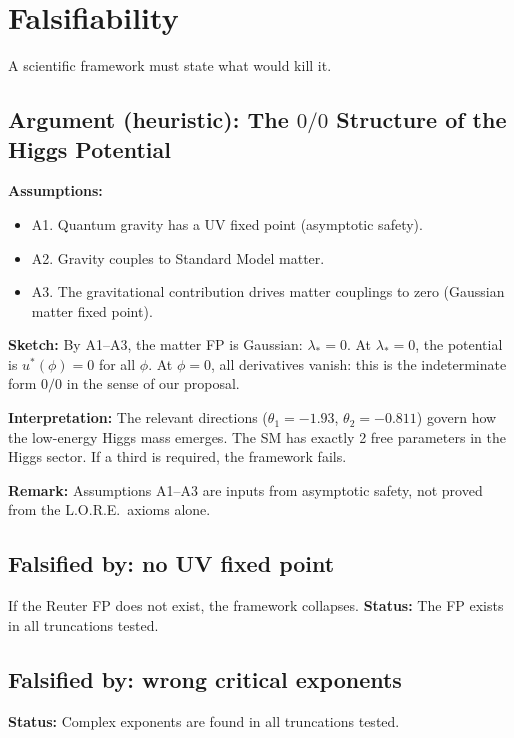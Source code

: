 \documentclass[12pt]{article}
\begin{document}
\section{Falsifiability}

A scientific framework must state what would kill it.

\subsection*{Argument (heuristic): The $0/0$ Structure of the Higgs Potential}

\textbf{Assumptions:}
\begin{itemize}
\item A1. Quantum gravity has a UV fixed point (asymptotic safety).
\item A2. Gravity couples to Standard Model matter.
\item A3. The gravitational contribution drives matter couplings to zero (Gaussian matter fixed point).
\end{itemize}

\textbf{Sketch:} By A1--A3, the matter FP is Gaussian: $\lambda_*=0$. At $\lambda_*=0$, the potential is $u^*(\phi)=0$ for all $\phi$. At $\phi=0$, all derivatives vanish: this is the indeterminate form $0/0$ in the sense of our proposal.

\textbf{Interpretation:} The relevant directions ($\theta_1=-1.93$, $\theta_2=-0.811$) govern how the low-energy Higgs mass emerges. The SM has exactly 2 free parameters in the Higgs sector. If a third is required, the framework fails.

\textbf{Remark:} Assumptions A1--A3 are inputs from asymptotic safety, not proved from the L.O.R.E.\ axioms alone.

\subsection{Falsified by: no UV fixed point}

If the Reuter FP does not exist, the framework collapses. \textbf{Status:} The FP exists in all truncations tested.

\subsection{Falsified by: wrong critical exponents}

\textbf{Status:} Complex exponents are found in all truncations tested.
\end{document}
